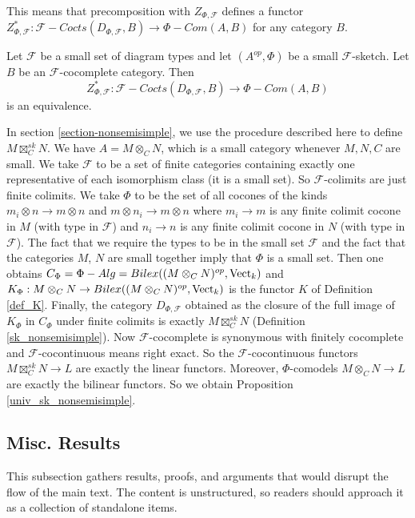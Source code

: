 This means that precomposition with $Z_{\Phi,\mathcal{F}}$ defines a functor $Z_{\Phi,\mathcal{F}}^*:\mathcal{F}-Cocts(D_{\Phi,\mathcal{F}},B)\to\Phi-Com(A,B)$ for any category $B$.

\begin{theorem}\cite[Theorem 6.23]{kelly/basic-concepts-enriched}\label{f_theory_small_sketch}
Let $\mathcal{F}$ be a small set of diagram types and let $(A^{op},\Phi)$ be a small $\mathcal{F}$-sketch. Let $B$ be an $\mathcal{F}$-cocomplete category. Then $$Z_{\Phi,\mathcal{F}}^*:\mathcal{F}-Cocts(D_{\Phi,\mathcal{F}},B)\to\Phi-Com(A,B)$$ is an equivalence.
\end{theorem}

In section \ref{section-nonsemisimple}, we use the procedure described here to define $M\boxtimes_C^{sk}N$. We have $A=M\otimes_C N$, which is a small category whenever $M,N,C$ are small. We take $\mathcal{F}$ to be a set of finite categories containing exactly one representative of each isomorphism class (it is a small set). So $\mathcal{F}$-colimits are just finite colimits. We take $\Phi$ to be the set of all cocones of the kinds $m_i\otimes n\to m\otimes n$ and $m\otimes n_i\to m\otimes n$ where $m_i\to m$ is any finite colimit cocone in $M$ (with type in $\mathcal{F}$) and $n_i\to n$ is any finite colimit cocone in $N$ (with type in $\mathcal{F}$). The fact that we require the types to be in the small set $\mathcal{F}$ and the fact that the categories $M$, $N$ are small together imply that $\Phi$ is a small set.  Then one obtains $C_{\Phi}=\Phi-Alg=Bilex((M\otimes_C N)^{op},\operatorname{Vect}_k)$ and $K_{\Phi}:M\otimes_C N\to Bilex((M\otimes_C N)^{op},\operatorname{Vect}_k)$ is the functor $K$ of Definition \ref{def_K}. Finally, the category $D_{\Phi,\mathcal{F}}$ obtained as the closure of the full image of $K_{\Phi}$ in $C_{\Phi}$ under finite colimits is exactly $M\boxtimes_C^{sk}N$ (Definition \ref{sk_nonsemisimple}). Now $\mathcal{F}$-cocomplete is synonymous with finitely cocomplete and $\mathcal{F}$-cocontinuous means right exact. So the $\mathcal{F}$-cocontinuous functors $M\boxtimes_C^{sk}N\to L$ are exactly the linear functors. Moreover, $\Phi$-comodels $M\otimes_C N\to L$ are exactly the bilinear functors. So we obtain Proposition \ref{univ_sk_nonsemisimple}.



\subsection{Misc. Results}
\noindent This subsection gathers results, proofs, and arguments that would
disrupt the flow of the main text. The content is unstructured, so readers
should approach it as a collection of standalone items.

